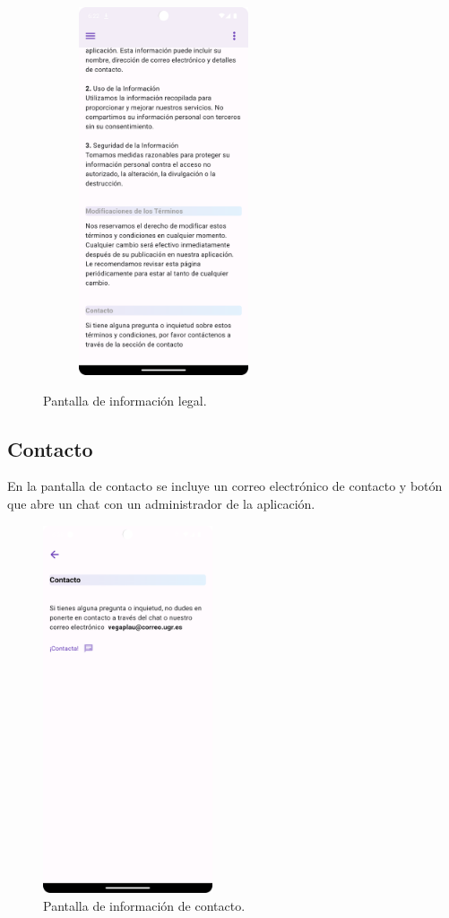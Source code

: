 \documentclass[a4paper, 12pt]{article}
\begin{document}
\begin{figure}[H]
\begin{subfigure}{0.48\textwidth}
\begin{center}
			{\includegraphics[width=5cm]{app/LegalPage2.png}\par}
		\end{center}  
	\end{subfigure}\hfill
	\caption{Pantalla de información legal.}
\end{figure}


\newpage
\subsection*{Contacto}

En la pantalla de contacto se incluye un correo electrónico de contacto y botón que abre un chat con un administrador de la aplicación.

\begin{figure}[H]
	\begin{center}
		{\includegraphics[width=5cm]{app/ContactPage.png}\par}
	\end{center}  
	\caption{Pantalla de información de contacto.}
\end{figure}
\end{document}
